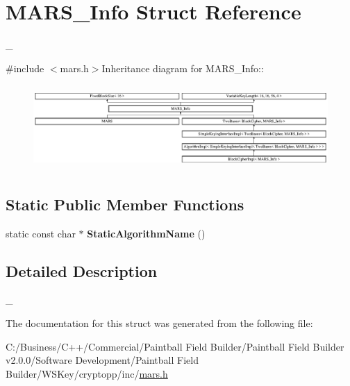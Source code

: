 \hypertarget{struct_m_a_r_s___info}{
\section{MARS\_\-Info Struct Reference}
\label{struct_m_a_r_s___info}
}


\_\-  


{\ttfamily \#include $<$mars.h$>$}Inheritance diagram for MARS\_\-Info::\begin{figure}[H]
\begin{center}
\leavevmode
\includegraphics[height=3.26848cm]{struct_m_a_r_s___info}
\end{center}
\end{figure}
\subsection*{Static Public Member Functions}
\begin{DoxyCompactItemize}
\item 
\hypertarget{struct_m_a_r_s___info_abbc61170d03ceaac867af2a92ca19331}{
static const char $\ast$ {\bfseries StaticAlgorithmName} ()}
\label{struct_m_a_r_s___info_abbc61170d03ceaac867af2a92ca19331}

\end{DoxyCompactItemize}


\subsection{Detailed Description}
\_\- 

The documentation for this struct was generated from the following file:\begin{DoxyCompactItemize}
\item 
C:/Business/C++/Commercial/Paintball Field Builder/Paintball Field Builder v2.0.0/Software Development/Paintball Field Builder/WSKey/cryptopp/inc/\hyperlink{mars_8h}{mars.h}\end{DoxyCompactItemize}
